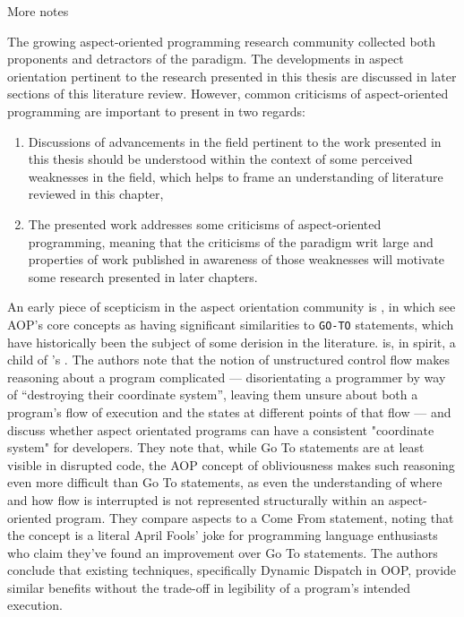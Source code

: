 More notes~


The growing aspect-oriented programming research community collected both
proponents and detractors of the paradigm. The developments in
aspect orientation pertinent to the research presented in this thesis are
discussed in later sections of this literature review. However, common
criticisms of aspect-oriented programming are important to present in two
regards:

\begin{enumerate}
    \item Discussions of advancements in the field pertinent to the work
    presented in this thesis should be understood within the context of some
    perceived weaknesses in the field, which helps to frame an understanding of
    literature reviewed in this chapter,
    \item The presented work addresses some criticisms of aspect-oriented
    programming, meaning that the criticisms of the paradigm writ large and
    properties of work published in awareness of those weaknesses will motivate
    some research presented in later chapters.
\end{enumerate}

An early piece of scepticism in the aspect orientation community is
\cite{Constantinides04aopconsidered}, in which
\citeauthor{Constantinides04aopconsidered} see AOP's core concepts as having
significant similarities to \lstinline{GO-TO} statements, which have
historically been the subject of some derision in the literature.
\cite{Constantinides04aopconsidered} is, in spirit, a child of
\citeauthor{dijkstra1968letters}'s . The authors
note that the notion of unstructured control flow makes reasoning about a
program complicated --- disorientating a programmer by way of ``destroying their
coordinate system'', leaving them unsure about both a program's flow of
execution and the states at different points of that flow --- and discuss
whether aspect orientated programs can have a consistent "coordinate system" for
developers. They note that, while Go To statements are at least visible in
disrupted code, the AOP concept of obliviousness makes such reasoning even more
difficult than Go To statements, as even the understanding of where and how flow
is interrupted is not represented structurally within an aspect-oriented
program. They compare aspects to a Come From statement, noting that the concept
is a literal April Fools' joke for programming language enthusiasts who claim
they've found an improvement over Go To statements. The authors conclude that
existing techniques, specifically Dynamic Dispatch in OOP, provide similar
benefits without the trade-off in legibility of a program's intended execution.


